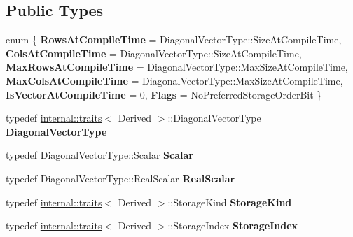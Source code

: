 \subsection*{Public Types}
\begin{DoxyCompactItemize}
\item 
\mbox{\label{class_eigen_1_1_diagonal_base_a6b678478f4b3438cad56c89d1c59399d}} 
enum \{ \newline
{\bfseries Rows\+At\+Compile\+Time} = Diagonal\+Vector\+Type\+::Size\+At\+Compile\+Time, 
{\bfseries Cols\+At\+Compile\+Time} = Diagonal\+Vector\+Type\+::Size\+At\+Compile\+Time, 
{\bfseries Max\+Rows\+At\+Compile\+Time} = Diagonal\+Vector\+Type\+::Max\+Size\+At\+Compile\+Time, 
{\bfseries Max\+Cols\+At\+Compile\+Time} = Diagonal\+Vector\+Type\+::Max\+Size\+At\+Compile\+Time, 
\newline
{\bfseries Is\+Vector\+At\+Compile\+Time} = 0, 
{\bfseries Flags} = No\+Preferred\+Storage\+Order\+Bit
 \}
\item 
\mbox{\label{class_eigen_1_1_diagonal_base_a1f8d7fbcf424eca7f639213484a2d51b}} 
typedef \mbox{\hyperlink{struct_eigen_1_1internal_1_1traits}{internal\+::traits}}$<$ Derived $>$\+::Diagonal\+Vector\+Type {\bfseries Diagonal\+Vector\+Type}
\item 
\mbox{\label{class_eigen_1_1_diagonal_base_a1e21c32c49ea8d2053c03dab3a2e698b}} 
typedef Diagonal\+Vector\+Type\+::\+Scalar {\bfseries Scalar}
\item 
\mbox{\label{class_eigen_1_1_diagonal_base_a8d046c4e1744039ba3bd8bcfdbc47fab}} 
typedef Diagonal\+Vector\+Type\+::\+Real\+Scalar {\bfseries Real\+Scalar}
\item 
\mbox{\label{class_eigen_1_1_diagonal_base_a093f1f20c042b2624e42645e407a2d6a}} 
typedef \mbox{\hyperlink{struct_eigen_1_1internal_1_1traits}{internal\+::traits}}$<$ Derived $>$\+::Storage\+Kind {\bfseries Storage\+Kind}
\item 
\mbox{\label{class_eigen_1_1_diagonal_base_a0850b562c94689d6f1b24805749fa127}} 
typedef \mbox{\hyperlink{struct_eigen_1_1internal_1_1traits}{internal\+::traits}}$<$ Derived $>$\+::Storage\+Index {\bfseries Storage\+Index}

\end{DoxyCompactItemize}
